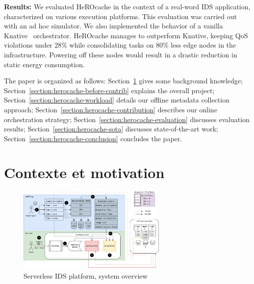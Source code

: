 \textbf{Results:} We evaluated HeROcache in the context of a real-word IDS application, characterized on various execution platforms. This evaluation was carried out with an ad hoc simulator. We also implemented the behavior of a vanilla Knative~\cite{knative} orchestrator. HeROcache manages to outperform Knative, keeping QoS violations under 28\% while consolidating tasks on 80\% less edge nodes in the infrastructure. Powering off these nodes would result in a drastic reduction in static energy consumption.

The paper is organized as follows: Section~\ref{section:herocache-background} gives some background knowledge; Section~\ref{section:herocache-before-contrib} explains the overall project; Section~\ref{section:herocache-workload} details our offline metadata collection approach; Section~\ref{section:herocache-contribution} describes our online orchestration strategy; Section~\ref{section:herocache-evaluation} discusses evaluation results; Section~\ref{section:herocache-sota} discusses state-of-the-art work; Section~\ref{section:herocache-conclusion} concludes the paper.

\section{Contexte et motivation}
\label{section:herocache-background}



\begin{figure}[t]
\centering
\includegraphics[width=0.65\textwidth]{6_Chapitre4/figures/serverless-platform-storage.png}
\caption{Serverless IDS platform, system overview}
\label{figure:herocache-serverless-platform}
\end{figure}

